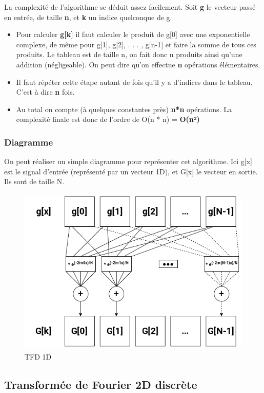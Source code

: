 \documentclass{article}
\begin{document}
La complexité de l'algorithme se déduit assez facilement. Soit \textbf{g} le vecteur passé en entrée, de taille \textbf{n}, et \textbf{k} un indice quelconque de g.
\begin{itemize}
	\item Pour calculer \textbf{g[k]} il faut calculer le produit de g[0] avec une exponentielle complexe, de même pour g[1], g[2], . . . , g[n-1] et faire la somme de tous ces produits. Le tableau est de taille n, on fait donc n produits ainsi qu'une addition (négligeable). On peut dire qu'on effectue \textbf{n} opérations élémentaires.
	\item Il faut répéter cette étape autant de fois qu'il y a d'indices dans le tableau. C'est à dire \textbf{n} fois.
	\item Au total on compte (à quelques constantes près) \textbf{n*n} opérations.
	La complexité finale est donc de l'ordre de O(n * n) = \textbf{O(n²)} 
\end{itemize}

\subsubsection{Diagramme}

On peut réaliser un simple diagramme pour représenter cet algorithme. Ici g[x] est le signal d'entrée (représenté par un vecteur 1D), et G[x] le vecteur en sortie. Ils sont de taille N.

\begin{figure}[!htb]
	\centering
	\includegraphics[height=8cm]{./assets/TFD1D.png}
	\caption{TFD 1D}
	\label{fig:TFD1D}
\end{figure}

\subsection{Transformée de Fourier 2D discrète}
\end{document}
